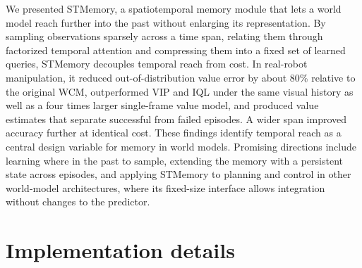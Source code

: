 \documentclass[10pt,a4paper]{article}
\begin{document}
We presented STMemory, a spatiotemporal memory module that lets a world model reach further into the past without enlarging its representation. By sampling observations sparsely across a time span, relating them through factorized temporal attention and compressing them into a fixed set of learned queries, STMemory decouples temporal reach from cost. In real-robot manipulation, it reduced out-of-distribution value error by about 80\% relative to the original WCM, outperformed VIP and IQL under the same visual history as well as a four times larger single-frame value model, and produced value estimates that separate successful from failed episodes. A wider span improved accuracy further at identical cost. These findings identify temporal reach as a central design variable for memory in world models. Promising directions include learning where in the past to sample, extending the memory with a persistent state across episodes, and applying STMemory to planning and control in other world-model architectures, where its fixed-size interface allows integration without changes to the predictor.

\appendix
\section{Implementation details}
\label{app:impl}
\end{document}
